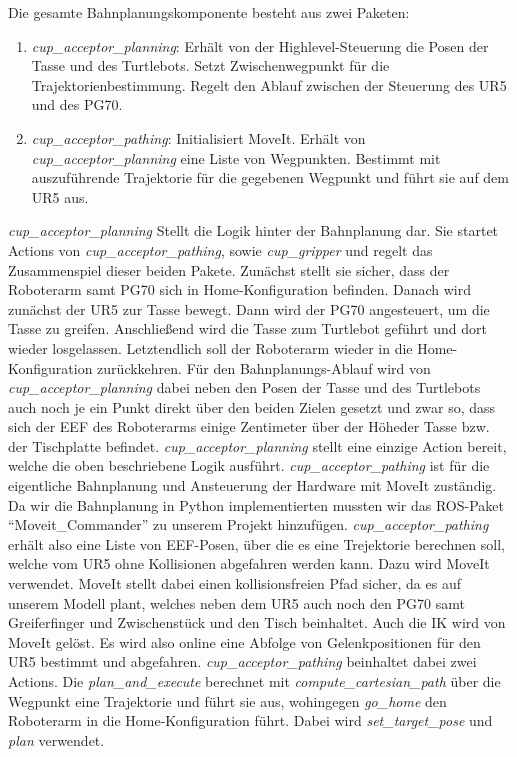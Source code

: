 Die gesamte Bahnplanungskomponente besteht aus zwei Paketen:
\begin{enumerate}
	\item \textit{cup_acceptor_planning}:
				\newline
				Erhält von der Highlevel-Steuerung die Posen der Tasse und des Turtlebots. Setzt Zwischenwegpunkt für die Trajektorienbestimmung. Regelt den Ablauf zwischen der Steuerung des UR5 und des PG70.
	\item \textit{cup_acceptor_pathing}:
				\newline
				Initialisiert MoveIt. Erhält von \textit{cup_acceptor_planning} eine Liste von Wegpunkten. Bestimmt mit auszuführende Trajektorie für die gegebenen Wegpunkt und führt sie auf dem UR5 aus.
\end{enumerate}
\textit{cup_acceptor_planning} Stellt die Logik hinter der Bahnplanung dar. Sie startet Actions von \textit{cup_acceptor_pathing}, sowie \textit{cup_gripper} und regelt das Zusammenspiel dieser beiden Pakete. Zunächst stellt sie sicher, dass der Roboterarm samt PG70 sich in Home-Konfiguration befinden. Danach wird zunächst der UR5 zur Tasse bewegt. Dann wird der PG70 angesteuert, um die Tasse zu greifen. Anschließend wird die Tasse zum Turtlebot geführt und dort wieder losgelassen. Letztendlich soll der Roboterarm wieder in die Home-Konfiguration zurückkehren. Für den Bahnplanungs-Ablauf wird von \textit{cup_acceptor_planning} dabei neben den Posen der Tasse und des Turtlebots auch noch je ein Punkt direkt über den beiden Zielen gesetzt und zwar so, dass sich der EEF des Roboterarms einige Zentimeter über der Höheder Tasse bzw. der Tischplatte befindet. \textit{cup_acceptor_planning} stellt eine einzige Action bereit, welche die oben beschriebene Logik ausführt. 
\newline
\textit{cup_acceptor_pathing} ist für die eigentliche Bahnplanung und Ansteuerung der Hardware mit MoveIt zuständig. Da wir die Bahnplanung in Python implementierten mussten wir das ROS-Paket "`Moveit_Commander"' \cite{MoveItCommander} zu unserem Projekt hinzufügen. \textit{cup_acceptor_pathing} erhält also eine Liste von EEF-Posen, über die es eine Trejektorie berechnen soll, welche vom UR5 ohne Kollisionen abgefahren werden kann. Dazu wird MoveIt verwendet. MoveIt stellt dabei einen kollisionsfreien Pfad sicher, da es auf unserem Modell plant, welches neben dem UR5 auch noch den PG70 samt Greiferfinger und Zwischenstück und den Tisch beinhaltet. Auch die IK wird von MoveIt gelöst. Es wird also online eine Abfolge von Gelenkpositionen für den UR5 bestimmt und abgefahren. \textit{cup_acceptor_pathing} beinhaltet dabei zwei Actions. Die \textit{plan_and_execute} berechnet mit \textit{compute_cartesian_path} über die Wegpunkt eine Trajektorie und führt sie aus, wohingegen \textit{go_home} den Roboterarm in die Home-Konfiguration führt. Dabei wird \textit{set_target_pose} und \textit{plan} verwendet.
